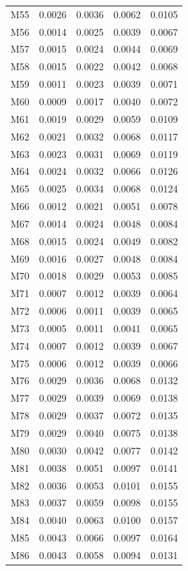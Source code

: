\begin{longtable}{lrrrr}
M55 & 0.0026 & 0.0036 & 0.0062 & 0.0105 \\
M56 & 0.0014 & 0.0025 & 0.0039 & 0.0067 \\
M57 & 0.0015 & 0.0024 & 0.0044 & 0.0069 \\
M58 & 0.0015 & 0.0022 & 0.0042 & 0.0068 \\
M59 & 0.0011 & 0.0023 & 0.0039 & 0.0071 \\
M60 & 0.0009 & 0.0017 & 0.0040 & 0.0072 \\
M61 & 0.0019 & 0.0029 & 0.0059 & 0.0109 \\
M62 & 0.0021 & 0.0032 & 0.0068 & 0.0117 \\
M63 & 0.0023 & 0.0031 & 0.0069 & 0.0119 \\
M64 & 0.0024 & 0.0032 & 0.0066 & 0.0126 \\
M65 & 0.0025 & 0.0034 & 0.0068 & 0.0124 \\
M66 & 0.0012 & 0.0021 & 0.0051 & 0.0078 \\
M67 & 0.0014 & 0.0024 & 0.0048 & 0.0084 \\
M68 & 0.0015 & 0.0024 & 0.0049 & 0.0082 \\
M69 & 0.0016 & 0.0027 & 0.0048 & 0.0084 \\
M70 & 0.0018 & 0.0029 & 0.0053 & 0.0085 \\
M71 & 0.0007 & 0.0012 & 0.0039 & 0.0064 \\
M72 & 0.0006 & 0.0011 & 0.0039 & 0.0065 \\
M73 & 0.0005 & 0.0011 & 0.0041 & 0.0065 \\
M74 & 0.0007 & 0.0012 & 0.0039 & 0.0067 \\
M75 & 0.0006 & 0.0012 & 0.0039 & 0.0066 \\
M76 & 0.0029 & 0.0036 & 0.0068 & 0.0132 \\
M77 & 0.0029 & 0.0039 & 0.0069 & 0.0138 \\
M78 & 0.0029 & 0.0037 & 0.0072 & 0.0135 \\
M79 & 0.0029 & 0.0040 & 0.0075 & 0.0138 \\
M80 & 0.0030 & 0.0042 & 0.0077 & 0.0142 \\
M81 & 0.0038 & 0.0051 & 0.0097 & 0.0141 \\
M82 & 0.0036 & 0.0053 & 0.0101 & 0.0155 \\
M83 & 0.0037 & 0.0059 & 0.0098 & 0.0155 \\
M84 & 0.0040 & 0.0063 & 0.0100 & 0.0157 \\
M85 & 0.0043 & 0.0066 & 0.0097 & 0.0164 \\
M86 & 0.0043 & 0.0058 & 0.0094 & 0.0131 \\

\end{longtable}

